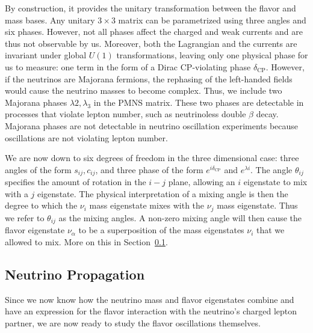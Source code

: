 By construction, it provides the unitary transformation between the flavor and mass bases.
Any unitary $3\times3$ matrix can be parametrized using three angles and six phases. However, not all phases affect the 
charged and weak currents and are thus not observable by us. Moreover, both the Lagrangian and the currents are invariant under global $U(1)$ transformations,
leaving only one physical phase for us to measure: one term in the form of a Dirac CP-violating phase $\delta_\mathrm{CP}$.
However, if the neutrinos are Majorana fermions, the rephasing of the left-handed fields would cause the neutrino masses to become complex.
Thus, we include two Majorana phases $\lambda{2},\lambda_3$ in the PMNS matrix. These two phases are detectable in processes that violate lepton number, such as neutrinoless double $\beta$ decay.
Majorana phases are not detectable in neutrino oscillation experiments because oscillations are not violating lepton number.

We are now down to six degrees of freedom in the three dimensional case: three angles
of the form $s_{ij}, c_{ij}$, and three phase of the form $e^{i\delta_\mathrm{CP}}$ and $e^{\lambda{i}}$. The angle $\theta_{ij}$ specifies the amount of rotation in the $i-j$ plane, allowing an $i$ eigenstate to mix with a $j$ eigenstate. The physical interpretation of
a mixing angle is then the degree to which the $\nu_i$ mass eigenstate mixes with the $\nu_j$ mass eigenstate. Thus we refer to $\theta_{ij}$ as the mixing angles. A non-zero mixing angle will then 
cause the flavor eigenstate $\nu_\alpha$ to be a superposition of the mass eigenstates $\nu_i$ that we allowed to mix. More on this in Section~\ref{sec:prop}.


\subsection{Neutrino Propagation}\label{sec:prop}
Since we now know how the neutrino mass and flavor eigenstates combine and have an expression for the flavor interaction with 
the neutrino's charged lepton partner, we are now ready to study the flavor oscillations themselves.

